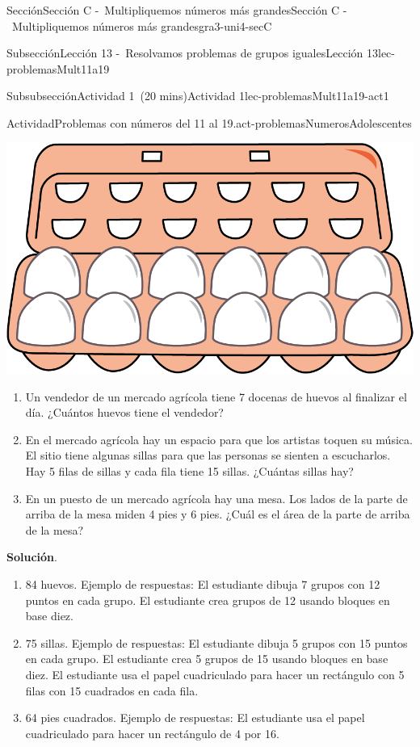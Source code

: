 \documentclass[oneside,10pt,]{article}
\newcommand{\blocktitlefont}{\relax}
\begin{document}
\begin{sectionptx}{Sección}{Sección C -~Multipliquemos números más grandes}{}{Sección C -~Multipliquemos números más grandes}{}{}{gra3-uni4-secC}
\begin{subsectionptx}{Subsección}{Lección 13 -~Resolvamos problemas de grupos iguales}{}{Lección 13}{}{}{lec-problemasMult11a19}
\begin{subsubsectionptx}{Subsubsección}{Actividad 1~(20 mins)}{}{Actividad 1}{}{}{lec-problemasMult11a19-act1}
\begin{activity}{Actividad}{Problemas con números del 11 al 19.}{act-problemasNumerosAdolescentes}
\begin{sidebyside}{2}{0.05}{0.05}{0.1}
\begin{sbspanel}{0.3}
\includegraphics[width=\linewidth]{external/png-source/egg_carton.png}
\end{sbspanel}%
\end{sidebyside}%
%
\begin{enumerate}
\item{}Un vendedor de un mercado agrícola tiene 7 docenas de huevos al finalizar el día. ¿Cuántos huevos tiene el vendedor?%
\item{}En el mercado agrícola hay un espacio para que los artistas toquen su música. El sitio tiene algunas sillas para que las personas se sienten a escucharlos. Hay 5 filas de sillas y cada fila tiene 15 sillas. ¿Cuántas sillas hay?%
\item{}En un puesto de un mercado agrícola hay una mesa. Los lados de la parte de arriba de la mesa miden 4 pies y 6 pies. ¿Cuál es el área de la parte de arriba de la mesa?%
\end{enumerate}
\par\smallskip%
\noindent\textbf{\blocktitlefont Solución}.\hypertarget{act-problemasNumerosAdolescentes-3}{}\quad{}%
\begin{enumerate}
\item{}84 huevos. Ejemplo de respuestas: El estudiante dibuja 7 grupos con 12 puntos en cada grupo. El estudiante crea grupos de 12 usando bloques en base diez.%
\item{}75 sillas. Ejemplo de respuestas: El estudiante dibuja 5 grupos con 15 puntos en cada grupo. El estudiante crea 5 grupos de 15 usando bloques en base diez. El estudiante usa el papel cuadriculado para hacer un rectángulo con 5 filas con 15 cuadrados en cada fila.%
\item{}64 pies cuadrados. Ejemplo de respuestas: El estudiante usa el papel cuadriculado para hacer un rectángulo de 4 por 16.%
\end{enumerate}

\end{activity}
\end{subsubsectionptx}
\end{subsectionptx}
\end{sectionptx}
\end{document}
